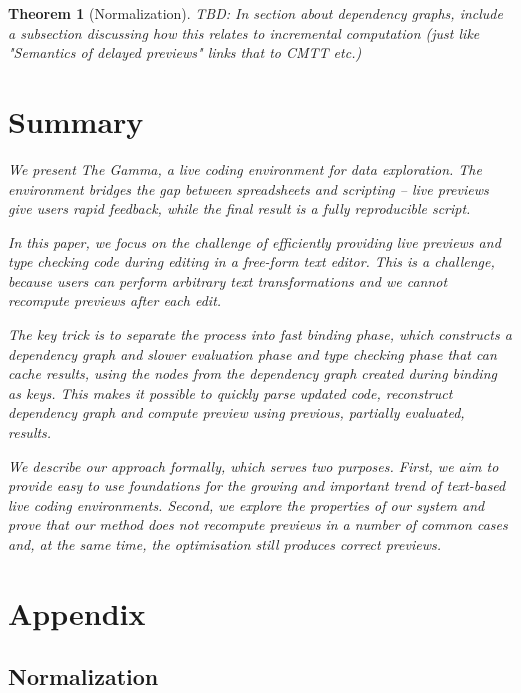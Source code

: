 \documentclass[acmsmall,anonymous,fleqn]{acmart}\settopmatter{printfolios=false,printccs=false,printacmref=false}
\newcounter{thc}
\theoremstyle{plain}
\newtheorem{theorem}[thc]{Theorem}
\theoremstyle{definition}
\begin{document}
\begin{theorem}[Normalization]
TBD: In section about dependency graphs, include a subsection discussing how this relates
to incremental computation (just like "Semantics of delayed previews" links that to CMTT etc.)


\section{Summary}
We present The Gamma, a live coding environment for data exploration. The environment
bridges the gap between spreadsheets and scripting -- live previews give users rapid feedback,
while the final result is a fully reproducible script.

In this paper, we focus on the challenge of efficiently providing live previews and type checking
code during editing in a free-form text editor. This is a challenge, because users can perform
arbitrary text transformations and we cannot recompute previews after each edit.

The key trick is to separate the process into fast \emph{binding phase},
which constructs a dependency graph and slower \emph{evaluation phase} and \emph{type checking phase}
that can cache results, using the nodes from the dependency graph created during binding as keys.
This makes it possible to quickly parse updated code, reconstruct dependency graph and compute
preview using previous, partially evaluated, results.

We describe our approach formally, which serves two purposes. First, we aim to provide easy to
use foundations for the growing and important trend of text-based live coding environments.
Second, we explore the properties of our system and prove that our method does not recompute
previews in a number of common cases and, at the same time, the optimisation still produces
correct previews.



\newpage
\appendix

\section{Appendix}

\subsection{Normalization}
\label{sec:app-normalization}


\end{theorem}
\end{document}
